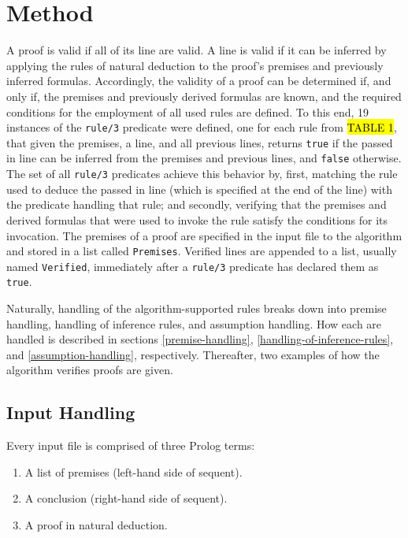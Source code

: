 \documentclass[a4paper, 11pt]{article}
\begin{document}
   \section{Method}
   
   A proof is valid if all of its line are valid. A line is
   valid if it can be inferred by applying the rules of
   natural deduction to the proof's premises and previously
   inferred formulas. Accordingly, the validity of a proof can
   be determined if, and only if, the premises and previously
   derived formulas are known, and the required conditions for
   the employment of all used rules are defined. To this end,
   19 instances of the \texttt{rule/3} predicate were defined,
   one for each rule from \hl{TABLE 1}, that given the
   premises, a line, and all previous lines, returns 
   \texttt{true} if the passed in line can be inferred from
   the premises and previous lines, and \texttt{false}
   otherwise. The set of all \texttt{rule/3} predicates 
   achieve this behavior by, first, matching the rule used to
   deduce the passed in line (which is specified at the end 
   of the line) with the predicate handling that rule; and
   secondly, verifying that the premises and derived formulas 
   that were used to invoke the rule satisfy the conditions 
   for its invocation. The premises of a proof are specified
   in the input file to the algorithm and stored in a list
   called \texttt{Premises}. Verified lines are appended to a 
   list, usually named \texttt{Verified}, immediately after a
   \texttt{rule/3} predicate has declared them as
   \texttt{true}.
   \bigbreak

   Naturally, handling of the algorithm-supported rules breaks
   down into premise handling, handling of inference rules,
   and assumption handling. How each are handled is
   described in sections 
   \ref{premise-handling},
   \ref{handling-of-inference-rules}, and
   \ref{assumption-handling}, respectively. 
   Thereafter, two examples of how the algorithm verifies
   proofs are given.

   \subsection{Input Handling}
   \label{input-handling}
   
   Every input file is comprised of three Prolog terms:
   \begin{enumerate}
      \item A list of premises (left-hand side of sequent).
      \item A conclusion (right-hand side of sequent).
      \item A proof in natural deduction.
   \end{enumerate}
\end{document}
